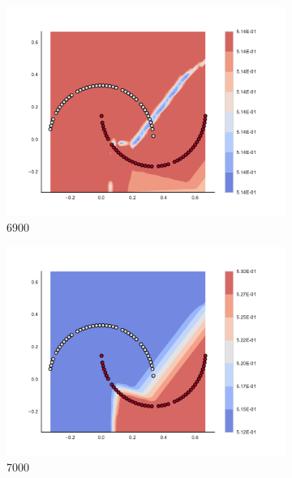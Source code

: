 \begin{figure}[h]
\begin{subfigure}[b]{0.09\textwidth}
    \includegraphics[clip, trim=2.35cm 1.75cm 4.5cm 0cm,width=\textwidth]{img/convergence/6900.pdf}
    \caption{6900}
    \label{fig:convergence_6900}
\end{subfigure}
%
\begin{subfigure}[b]{0.09\textwidth}
    \includegraphics[clip, trim=2.35cm 1.75cm 4.5cm 0cm,width=\textwidth]{img/convergence/7000.pdf}
    \caption{7000}
    \label{fig:convergence_7000}
\end{subfigure}
%
\begin{subfigure}[b]{0.09\textwidth}

\end{subfigure}
\end{figure}
